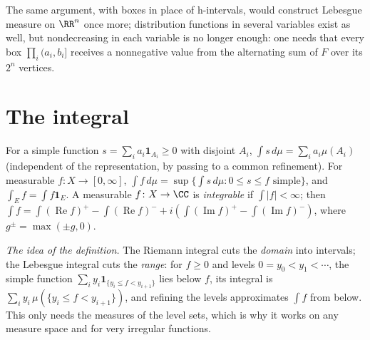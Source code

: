 The same argument, with boxes in place of h-intervals, would construct Lebesgue measure on $\RR^n$ once more; distribution functions in several variables exist as well, but nondecreasing in
each variable is no longer enough: one needs that every box $\prod_i(a_i, b_i]$ receives a nonnegative value from the alternating sum of $F$ over its $2^n$ vertices.

\section{The integral}\label{measure-theory:section-integral}

\begin{definition}\label{measure-theory:definition-integral}
For a simple function $s = \sum_ia_i\mathbf{1}_{A_i} \geq 0$ with disjoint $A_i$, $\int s\,d\mu = \sum_ia_i\mu(A_i)$ (independent of the representation, by passing to a common refinement). For measurable
$f \colon X \to [0, \infty]$, $\int f\,d\mu = \sup\{\int s\,d\mu : 0 \leq s \leq f \text{ simple}\}$, and $\int_Ef = \int f\mathbf{1}_E$. A measurable $f \colon X \to \CC$ is \emph{integrable} if $\int|f| < \infty$; then
$\int f = \int(\operatorname{Re}f)^+ - \int(\operatorname{Re}f)^- + i(\int(\operatorname{Im}f)^+ - \int(\operatorname{Im}f)^-)$, where $g^\pm = \max(\pm g, 0)$.
\end{definition}

\emph{The idea of the definition.} The Riemann integral cuts the \emph{domain} into intervals; the Lebesgue integral cuts the \emph{range}: for $f \geq 0$ and levels $0 = y_0 < y_1 < \cdots$, the simple
function $\sum_iy_i\mathbf{1}_{\{y_i \leq f < y_{i+1}\}}$ lies below $f$, its integral is $\sum_iy_i\,\mu(\{y_i \leq f < y_{i+1}\})$, and refining the levels approximates $\int f$ from below. This only needs the
measures of the level sets, which is why it works on any measure space and for very irregular functions.

